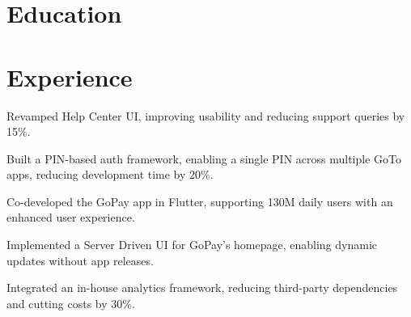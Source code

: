\documentclass{fonts}
\begin{document}
%
%


\section{Education} 


\sectionsep
{}


\section{Experience}
\textbf{\href{https://www.gojek.io/}{}} 
\begin{tightemize}
    \item Revamped Help Center UI, improving usability and reducing support queries by 15\%.
    \item Built a PIN-based auth framework, enabling a single PIN across multiple GoTo apps, reducing development time by 20\%.
    \item Co-developed the GoPay app in Flutter, supporting 130M daily users with an enhanced user experience.
    \item Implemented a Server Driven UI for GoPay's homepage, enabling dynamic updates without app releases.
    \item Integrated an in-house analytics framework, reducing third-party dependencies and cutting costs by 30\%.
\end{tightemize}
\sectionsep
\end{document}
